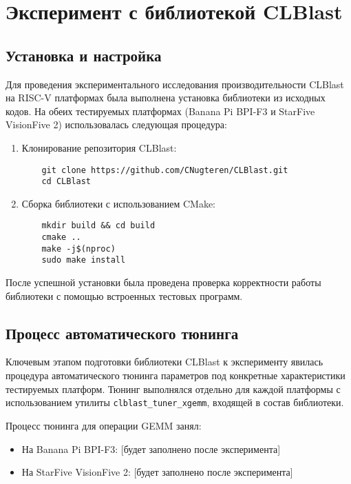 
\section{Эксперимент с библиотекой CLBlast}

\subsection{Установка и настройка}

Для проведения экспериментального исследования производительности CLBlast на RISC-V платформах была выполнена установка библиотеки из исходных кодов. На обеих тестируемых платформах (Banana Pi BPI-F3 и StarFive VisionFive 2) использовалась следующая процедура:

\begin{enumerate}
    \item Клонирование репозитория CLBlast:
    \begin{verbatim}
    git clone https://github.com/CNugteren/CLBlast.git
    cd CLBlast
    \end{verbatim}
    
    \item Сборка библиотеки с использованием CMake:
    \begin{verbatim}
    mkdir build && cd build
    cmake ..
    make -j$(nproc)
    sudo make install
    \end{verbatim}
\end{enumerate}

После успешной установки была проведена проверка корректности работы библиотеки с помощью встроенных тестовых программ.

\subsection{Процесс автоматического тюнинга}

Ключевым этапом подготовки библиотеки CLBlast к эксперименту явилась процедура автоматического тюнинга параметров под конкретные характеристики тестируемых платформ. Тюнинг выполнялся отдельно для каждой платформы с использованием утилиты \texttt{clblast\_tuner\_xgemm}, входящей в состав библиотеки.

Процесс тюнинга для операции GEMM занял:
\begin{itemize}
    \item На Banana Pi BPI-F3: [будет заполнено после эксперимента]
    \item На StarFive VisionFive 2: [будет заполнено после эксперимента]
\end{itemize}

